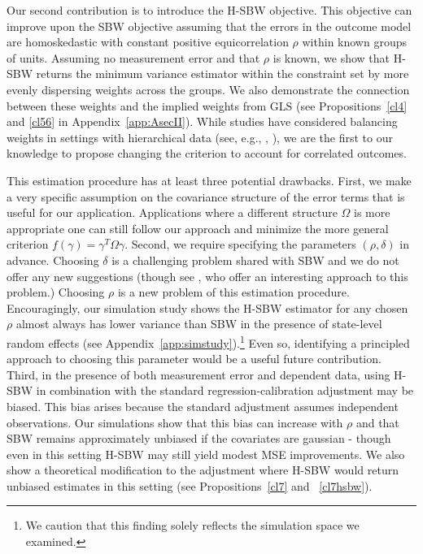 \documentclass[aoas]{imsart}
\theoremstyle{plain}
\theoremstyle{remark}
\begin{document}
Our second contribution is to introduce the H-SBW objective. This objective can improve upon the SBW objective assuming that the errors in the outcome model are homoskedastic with constant positive equicorrelation $\rho$ within known groups of units. Assuming no measurement error and that $\rho$ is known, we show that H-SBW returns the minimum variance estimator within the constraint set by more evenly dispersing weights across the groups. We also demonstrate the connection between these weights and the implied weights from GLS (see Propositions~\ref{cl4} and \ref{cl56} in Appendix~\ref{app:AsecII}). While studies have considered balancing weights in settings with hierarchical data (see, e.g., \cite{keele2020hospital}, \cite{ben2021multilevel}), we are the first to our knowledge to propose changing the criterion to account for correlated outcomes.

This estimation procedure has at least three potential drawbacks. First, we make a very specific assumption on the covariance structure of the error terms that is useful for our application. Applications where a different structure $\Omega$ is more appropriate one can still follow our approach and minimize the more general criterion $f(\gamma) = \gamma^T\Omega\gamma$. Second, we require specifying the parameters $(\rho, \delta)$ in advance. Choosing $\delta$ is a challenging problem shared with SBW and we do not offer any new suggestions (though see \cite{wang2020minimal}, who offer an interesting approach to this problem.) Choosing $\rho$ is a new problem of this estimation procedure. Encouragingly, our simulation study shows the H-SBW estimator for any chosen $\rho$ almost always has lower variance than SBW in the presence of state-level random effects (see Appendix~\ref{app:simstudy}).\footnote{We caution that this finding solely reflects the simulation space we examined.} Even so, identifying a principled approach to choosing this parameter would be a useful future contribution. Third, in the presence of both measurement error and dependent data, using H-SBW in combination with the standard regression-calibration adjustment may be biased. This bias arises because the standard adjustment assumes independent observations. Our simulations show that this bias can increase with $\rho$ and that SBW remains approximately unbiased if the covariates are gaussian - though even in this setting H-SBW may still yield modest MSE improvements. We also show a theoretical modification to the adjustment where H-SBW would return unbiased estimates in this setting (see Propositions~\ref{cl7} and ~\ref{cl7hsbw}).
\end{document}
